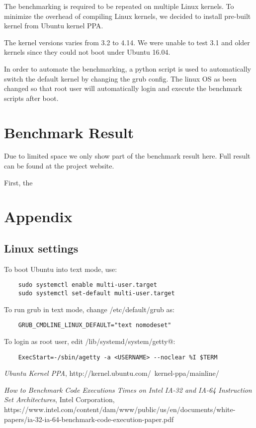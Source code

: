 \documentclass{article}
\begin{document}
The benchmarking is required to be repeated on multiple Linux kernels.
To minimize the overhead of compiling Linux kernels,
we decided to install pre-built kernel from Ubuntu kernel PPA\cite{kernelppa}. 

The kernel versions varies from 3.2 to 4.14. We were unable to test 3.1 and older kernels since they could not boot under Ubuntu 16.04.

In order to automate the benchmarking, a python script is used to automatically switch the default kernel by changing the grub config.
The linux OS as been changed so that root user will automatically login and execute the benchmark scripts after boot.


\section{Benchmark Result}

Due to limited space we only show part of the benchmark result here. Full result can be found at the project website.

First, the 



\section{Appendix}

\subsection{Linux settings}

To boot Ubuntu into text mode, use:

\begin{verbatim}
    sudo systemctl enable multi-user.target
    sudo systemctl set-default multi-user.target
\end{verbatim}

To run grub in text mode, change /etc/default/grub as:

\begin{verbatim}
    GRUB_CMDLINE_LINUX_DEFAULT="text nomodeset"
\end{verbatim}

To login as root user, edit /lib/systemd/system/getty@:

\begin{verbatim}
    ExecStart=-/sbin/agetty -a <USERNAME> --noclear %I $TERM
\end{verbatim}


\begin{thebibliography}{9}
    \raggedright
    \emph{Ubuntu Kernel PPA},
    http://kernel.ubuntu.com/~kernel-ppa/mainline/

    \emph{How to Benchmark Code Executions Times on Intel IA-32 and IA-64 Instruction Set Architectures},
    Intel Corporation,
    https://www.intel.com/content/dam/www/public/us/en/documents/white-papers/ia-32-ia-64-benchmark-code-execution-paper.pdf
\end{thebibliography}
\end{document}
